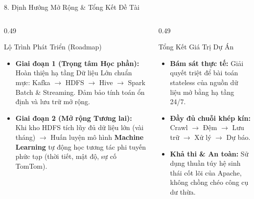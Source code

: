 \documentclass[aspectratio=169,10pt]{beamer}
\begin{document}
\begin{frame}{8. Định Hướng Mở Rộng \& Tổng Kết Đề Tài}
\begin{columns}[T]
    \begin{column}{0.49\textwidth}
        \begin{block}{Lộ Trình Phát Triển (Roadmap)}
            \begin{itemize}\setlength{\itemsep}{3pt}\footnotesize
                \item \textbf{Giai đoạn 1 (Trọng tâm Học phần):}\\
                Hoàn thiện hạ tầng Dữ liệu Lớn chuẩn mực: Kafka $\to$ HDFS $\to$ Hive $\to$ Spark Batch \& Streaming. Đảm bảo tính toán ổn định và lưu trữ mở rộng.
                \item \textbf{Giai đoạn 2 (Mở rộng Tương lai):}\\
                Khi kho HDFS tích lũy đủ dữ liệu lớn (vài tháng) $\to$ Huấn luyện mô hình \textbf{Machine Learning} tự động học tương tác phi tuyến phức tạp (thời tiết, mật độ, sự cố TomTom).
            \end{itemize}
        \end{block}
    \end{column}

    \begin{column}{0.49\textwidth}
        \begin{exampleblock}{Tổng Kết Giá Trị Dự Án}
            \begin{itemize}\setlength{\itemsep}{3pt}\footnotesize
                \item \textbf{Bám sát thực tế:} Giải quyết triệt để bài toán stateless của nguồn dữ liệu mở bằng hạ tầng 24/7.
                \item \textbf{Đầy đủ chuỗi khép kín:} Crawl $\to$ Đệm $\to$ Lưu trữ $\to$ Xử lý $\to$ Dự báo.
                \item \textbf{Khả thi \& An toàn:} Sử dụng thuần túy hệ sinh thái cốt lõi của Apache, không chồng chéo công cụ dư thừa.
            \end{itemize}
        \end{exampleblock}
        
        \vspace{0.15cm}
        \centering
    \end{column}
\end{columns}
\end{frame}
\end{document}
